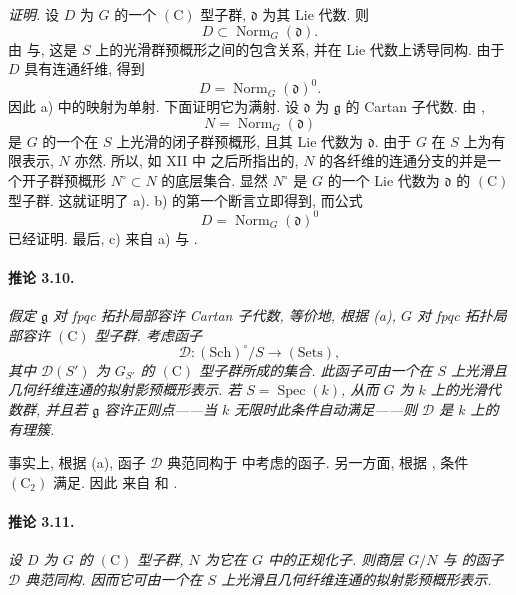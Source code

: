 \emph{证明.}
设 \(D\) 为 \(G\) 的一个 \((\mathrm C)\) 型子群, \(\mathfrak d\) 为其 Lie 代数. 则
\[
  D\subset\operatorname{Norm}_G(\mathfrak d).
\]
由 与, 这是 \(S\) 上的光滑群预概形之间的包含关系, 并在 Lie 代数上诱导同构. 由于 \(D\) 具有连通纤维, 得到
\[
  D=\operatorname{Norm}_G(\mathfrak d)^0.
\]
因此 a) 中的映射为单射. 下面证明它为满射. 设 \(\mathfrak d\) 为 \(\mathfrak g\) 的 Cartan 子代数. 由 ,
\[
  N=\operatorname{Norm}_G(\mathfrak d)
\]
是 \(G\) 的一个在 \(S\) 上光滑的闭子群预概形, 且其 Lie 代数为 \(\mathfrak d\). 由于 \(G\) 在 \(S\) 上为有限表示, \(N\) 亦然. 所以, 如 XII 中  之后所指出的, \(N\) 的各纤维的连通分支的并是一个开子群预概形 \(N^\circ\subset N\) 的底层集合. 显然 \(N^\circ\) 是 \(G\) 的一个 Lie 代数为 \(\mathfrak d\) 的 \((\mathrm C)\) 型子群. 这就证明了 a). b) 的第一个断言立即得到, 而公式
\[
  D=\operatorname{Norm}_G(\mathfrak d)^0
\]
已经证明. 最后, c) 来自 a) 与 .

\paragraph{\textbf{推论 3.10.}}
{\itshape 假定 \(\mathfrak g\) 对 fpqc 拓扑局部容许 Cartan 子代数, 等价地, 根据 \textup{(a)}, \(G\) 对 fpqc 拓扑局部容许 \((\mathrm C)\) 型子群. 考虑函子
\[
  \mathcal D\colon(\mathrm{Sch})^\circ/S\longrightarrow
  (\mathrm{Sets}),
\]
其中 \(\mathcal D(S')\) 为 \(G_{S'}\) 的 \((\mathrm C)\) 型子群所成的集合. 此函子可由一个在 \(S\) 上光滑且几何纤维连通的拟射影预概形表示. 若 \(S=\operatorname{Spec}(k)\), 从而 \(G\) 为 \(k\) 上的光滑代数群, 并且若 \(\mathfrak g\) 容许正则点——当 \(k\) 无限时此条件自动满足——则 \(\mathcal D\) 是 \(k\) 上的有理簇.}

事实上, 根据 \textup{(a)}, 函子 \(\mathcal D\) 典范同构于  中考虑的函子. 另一方面, 根据 , 条件 \((\mathrm C_2)\) 满足. 因此  来自  和 .

\paragraph{\textbf{推论 3.11.}}
{\itshape 设 \(D\) 为 \(G\) 的 \((\mathrm C)\) 型子群, \(N\) 为它在 \(G\) 中的正规化子. 则商层 \(G/N\) 与  的函子 \(\mathcal D\) 典范同构. 因而它可由一个在 \(S\) 上光滑且几何纤维连通的拟射影预概形表示.}

